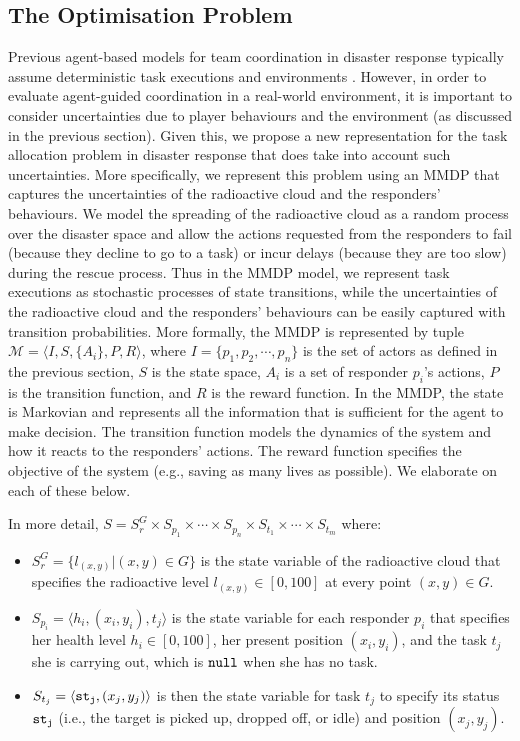 \subsection{The Optimisation Problem}
\label{sec:model} \noindent Previous agent-based models for team
coordination in disaster response typically assume deterministic
task executions and environments
\cite{ramchurn:etal:2010,Scerri2005}. However, in order to evaluate
agent-guided coordination in a real-world environment, it is
important to consider uncertainties due to player behaviours and
the environment (as discussed in the previous section). Given this,
we propose a new representation for the task allocation problem in
disaster response that does take into account such uncertainties.
More specifically, we represent this problem using an MMDP that
captures the uncertainties of the radioactive cloud and the
responders' behaviours. We model the spreading of the radioactive
cloud as a random process over the disaster space and allow the
actions requested from the responders to  fail (because they
decline to go to a  task) or incur delays (because they are too
slow) during the rescue process. Thus in the MMDP model, we
represent  task executions as stochastic processes of state
transitions, while the uncertainties of the radioactive cloud and
the responders' behaviours can be easily captured with transition
probabilities.  More formally, the MMDP is represented by tuple
$\mathcal{M} = \langle I, S, \{A_i\}, P, R \rangle$, where $I = \{
p_1, p_2, \cdots, p_n \}$ is the set of actors as defined in the
previous section, $S$ is the state space, $A_i$ is a set of
responder $p_i$'s actions, $P$ is the transition function, and $R$
is the reward function. In the MMDP, the state is Markovian and
represents all the information that is sufficient for the agent to
make decision. The transition function models the dynamics of the
system and how it reacts to the responders' actions. The reward
function specifies the objective of the system (e.g., saving as
many lives as possible). We elaborate on each of these below.

In more detail, $S= S^G_r \times S_{p_1} \times \cdots \times
S_{p_n} \times S_{t_1} \times \cdots \times S_{t_m}$ where:
\begin{itemize}
  \item $S^G_r = \{l_{(x,y)}| (x, y) \in G\}$ is the state
      variable of the radioactive cloud that specifies the
      radioactive level $l_{(x,y)}\in[0, 100]$ at every point
      $(x, y)\in G$.
  \item $S_{p_i} = \langle h_i, (x_i, y_i), t_j \rangle$ is the
      state variable for each responder $p_i$ that specifies
      her health level $h_i\in[0, 100]$, her present position
      $(x_i, y_i)$, and the task $t_j$ she is carrying out,
      which is ${\tt null}$ when she has no task.
  \item $S_{t_j} = \langle {\tt st_j}, (x_j, y_j) \rangle$ is
      then the state variable for task $t_j$ to specify its
      status ${\tt st_j}$ (i.e., the target is picked up,
      dropped off, or idle) and position $(x_j, y_j)$.
\end{itemize}

